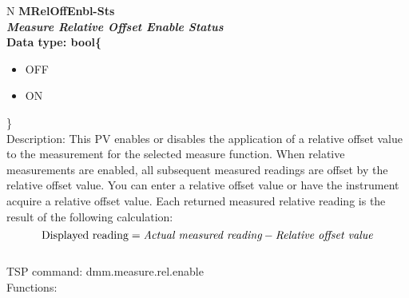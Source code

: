 \documentclass[openany]{article}
\begin{document}
		\begin{tabular}{N}
			\hline
			\bfseries MRelOffEnbl-Sts\label{pv:mreloffenbl-sts} \\ \hline
			\emph{Measure Relative Offset Enable Status} \\
			Data type: bool\{\begin{itemize}[noitemsep]
				\small
				\item[] OFF
				\item[] ON
			\end{itemize}\} \\
			Description: This PV enables or disables the application of a relative offset value to the measurement for the selected measure function. When relative measurements are enabled, all subsequent measured readings are offset by the relative offset value. You can enter a relative offset value or have the instrument acquire a relative offset value. Each returned measured relative reading is the result of the following calculation: $$\text{Displayed reading} = \emph{Actual measured reading} - \emph{Relative offset value}$$ \\
			TSP command: dmm.measure.rel.enable \\
			Functions: \\
			\arrayrulecolor{\FuncTableBorderColor}

		\end{tabular}
\end{document}
